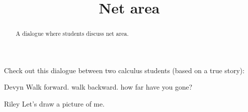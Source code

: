 \documentclass{ximera}
\title[Break-Ground:]{Net area}
\begin{document}
\begin{abstract}
A dialogue where students discuss net area.
\end{abstract}
\maketitle

Check out this dialogue between two calculus students (based on a true story):

\begin{dialogue}
\item[Devyn] Walk forward. walk backward.  how far have you gone?
\item[Riley] Let's draw a picture of me.
\end{dialogue}







\end{document}

